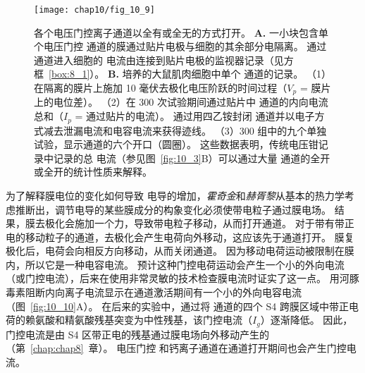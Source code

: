 \begin{figure}[htbp]
	\centering
	\texttt{[image: chap10/fig\_10\_9]}
	\caption{各个电压门控离子通道以全有或全无的方式打开。
		\textbf{A.} 一小块包含单个电压门控  通道的膜通过贴片电极与细胞的其余部分电隔离。
		通过通道进入细胞的  电流由连接到贴片电极的监视器记录（见方框~\ref{box:8_1}）。
		\textbf{B.} 培养的大鼠肌肉细胞中单个  通道的记录。
		（1）在隔离的膜片上施加 10 毫伏去极化电压阶跃的时间过程（$V_p$ = 膜片上的电位差）。
		（2）在 300 次试验期间通过贴片中  通道的内向电流总和（$I_p$ = 通过贴片的电流）。
		通过用四乙铵封闭  通道并以电子方式减去泄漏电流和电容电流来获得迹线。
		（3）300 组中的九个单独试验，显示通道的六个开口（圆圈）。
		这些数据表明，传统电压钳记录中记录的总  电流（参见图~\ref{fig:10_3}B）可以通过大量  通道的全开或全开的统计性质来解释\cite{sigworth1980single}。}
	\label{fig:10_9}
\end{figure}


为了解释膜电位的变化如何导致  电导的增加，\textit{霍奇金}和\textit{赫胥黎}从基本的热力学考虑推断出，调节电导的某些膜成分的构象变化必须使带电粒子通过膜电场。
结果，膜去极化会施加一个力，导致带电粒子移动，从而打开通道。
对于带有带正电的移动粒子的通道，去极化会产生电荷向外移动，这应该先于通道打开。
膜复极化后，电荷会向相反方向移动，从而关闭通道。 
因为移动电荷运动被限制在膜内，所以它是一种电容电流。
预计这种门控电荷运动会产生一个小的外向电流（或门控电流），后来在使用非常灵敏的技术检查膜电流时证实了这一点。
用河豚毒素阻断内向离子电流显示在通道激活期间有一个小的外向电容电流（图~\ref{fig:10_10}A）。 
在后来的实验中，通过将  通道的四个 S4 跨膜区域中带正电荷的赖氨酸和精氨酸残基突变为中性残基，该门控电流（$I_g$）逐渐降低。 
因此，门控电流是由 S4 区带正电的残基通过膜电场向外移动产生的（第~\ref{chap:chap8}~章）。 
电压门控  和钙离子通道在通道打开期间也会产生门控电流。


